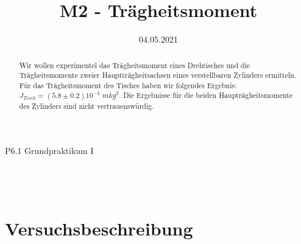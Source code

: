 \documentclass[bibliography=totocnumbered]{scrartcl}
\title{M2 - Trägheitsmoment}
\date{04.05.2021}
\begin{document}
	\begin{titlepage}
		\begin{center}
			{\huge{P6.1 Grundpraktikum I}}\\\vspace*{15mm}
			{\huge{\textbf{\thetitle}}}\\\vspace*{20mm}
			{\theauthor}\\\vspace*{10mm}
			{\thedate}\\\vspace*{20mm}
			
			\vspace{1.5cm}
			\begin{abstract}
				Wir wollen experimentel das Trägheitsmoment eines Drehtisches und die Trägheitsmomente zweier Hauptträgheitsachsen eines verstellbaren Zylinders ermitteln. Für das Trägheitsmoment des Tisches haben wir folgendes Ergebnis: $ J_{Tisch} =(5.8\pm 0.2)10^{-4} \textit{ mkg}^{2}$. Die Ergebnisse für die beiden Haupträgheitsmomente des Zylinders sind nicht vertrauenswürdig.
			\end{abstract}
			
			
		\end{center}
	\end{titlepage}
	\makeatother
	\restoregeometry
	\newpage
	
	\tableofcontents
	\listoffigures 
	\listoftables
	\newpage

	
	
	\section{Versuchsbeschreibung}
\end{document}
